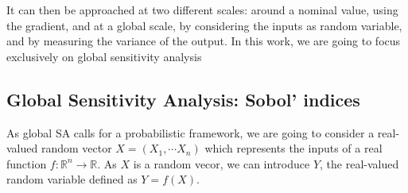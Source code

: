 \documentclass[../../Main_ManuscritThese.tex]{subfiles}
\begin{document}
It can then be approached at two different scales:
around a nominal value, using the gradient, and at a global scale, by
considering the inputs as random variable, and by measuring the
variance of the output. In this work, we are going to focus
exclusively on global sensitivity analysis
\subsection{Global Sensitivity Analysis: Sobol' indices}
\label{sec:sobol-indices}
As global SA calls for a probabilistic framework, we are going to
consider a real-valued random vector $X=(X_1,\cdots X_n)$ which
represents the inputs of a real function
$f: \mathbb{R}^n \rightarrow \mathbb{R}$.  As $X$ is a random vecor,
we can introduce $Y$, the real-valued random variable defined
as $Y=f(X)$.
\end{document}
